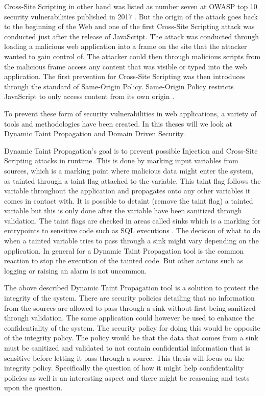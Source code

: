 \documentclass{../kththesis}
\begin{document}
Cross-Site Scripting in other hand was listed as number seven at OWASP top 10 security vulnerabilities published in 2017 \parencite{OWASP2017}. But the origin of the attack goes back to the beginning of the Web and one of the first Cross-Site Scripting attack was conducted just after the release of JavaScript. The attack was conducted through loading a malicious web application into a frame on the site that the attacker wanted to gain control of. The attacker could then through malicious scripts from the malicious frame access any content that was visible or typed into the web application. The first prevention for Cross-Site Scripting was then introduces through the standard of Same-Origin Policy. Same-Origin Policy restricts JavaScript to only access content from its own origin \parencite{FogieSeth2007Xacs, w3csop}.

To prevent these form of security vulnerabilities in web applications, a variety of tools and methodologies have been created. In this theses will we look at Dynamic Taint Propagation and Domain Driven Security. 

Dynamic Taint Propagation's goal is to prevent possible Injection and Cross-Site Scripting attacks in runtime. This is done by marking input variables from sources, which is a marking point where malicious data might enter the system, as tainted through a taint flag attached to the variable. This taint flag follows the variable throughout the application and propagates onto any other variables it comes in contact with. It is possible to detaint (remove the taint flag) a tainted variable but this is only done after the variable have been sanitized through validation. The taint flags are checked in areas called sinks which is a marking for entrypoints to sensitive code such as SQL executions \parencite{Pan2015, Venkataramani2008}. The decision of what to do when a tainted variable tries to pass through a sink might vary depending on the application. In general for a Dynamic Taint Propagation tool is the common reaction to stop the execution of the tainted code. But other actions such as logging or raising an alarm is not uncommon. 

The above described Dynamic Taint Propagation tool is a solution to protect the integrity of the system. There are security policies detailing that no information from the sources are allowed to pass through a sink without first being sanitized through validation. The same application could however be used to enhance the confidentiality of the system. The security policy for doing this would be opposite of the integrity policy. The policy would be that the data that comes from a sink must be sanitized and validated to not contain confidential information that is sensitive before letting it pass through a source. This thesis will focus on the integrity policy. Specifically the question of how it might help confidentiality policies as well is an interesting aspect and there might be reasoning and tests upon the question.
\end{document}
